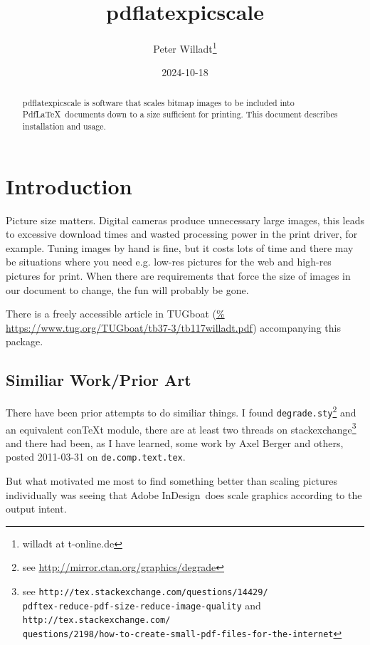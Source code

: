 \documentclass[10pt,a4paper]{article}
\title{pdflatexpicscale}
\author{Peter Willadt\footnote{willadt at t-online.de}}
\date{2024-10-18} %
\begin{document}
\maketitle

\begin{abstract}
  \noindent pdflatexpicscale is software that scales bitmap images to be
  included into Pdf\LaTeX\ documents down to a size sufficient for printing.
  This document describes installation and usage.
\end{abstract}

\tableofcontents

\section{Introduction}

Picture size matters. Digital cameras produce unnecessary large images, this
leads to excessive download times and wasted processing power in the print
driver, for example. Tuning images by hand is fine, but it costs lots of time
and there may be situations where you need e.g. low-res pictures for the web
and high-res pictures for print. When there are requirements that force the
size of images in our document to change, the fun will probably be gone.

There is a freely accessible article\label{tugboatart} in TUGboat (\url{%
https://www.tug.org/TUGboat/tb37-3/tb117willadt.pdf}) accompanying
this package.


\subsection{Similiar Work/Prior Art}

There have been prior attempts to do similiar things. I found
\texttt{degrade.sty}\footnote{see
  \url{http://mirror.ctan.org/graphics/degrade}} 
 and an equivalent con\TeX t module, there are at least two threads on
 stackexchange\footnote{see
   \texttt{http://tex.stackexchange.com/questions/14429/\\
pdftex-reduce-pdf-size-reduce-image-quality}
and 
\texttt{http://tex.stackexchange.com/\\questions/2198/how-to-create-small-pdf-files-for-the-internet}}
 and there had been, as
I have learned, some work by Axel Berger and others, posted 2011-03-31 on
\texttt{de.comp.text.tex}. 

But what motivated me most to find something better than scaling pictures
individually was seeing that Adobe InDesign\textregistered\ does
scale graphics according to the output intent.
\end{document}
